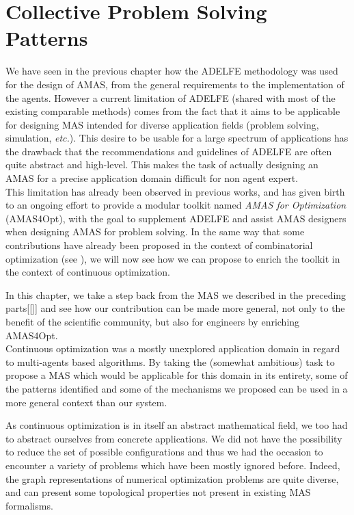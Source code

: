 \chapter{Collective Problem Solving Patterns}\label{CPSP}

We have seen in the previous chapter how the ADELFE methodology was used for the design of AMAS, from the general requirements to the implementation of the agents. However a current limitation of ADELFE (shared with most of the existing comparable methods) comes from the fact that it aims to be applicable for designing MAS intended for diverse application fields (problem solving, simulation, \emph{etc.}). This desire to be usable for a large spectrum of applications has the drawback that the recommendations and guidelines of ADELFE are often quite abstract and high-level. This makes the task of actually designing an AMAS for a precise application domain difficult for non agent expert.\\
This limitation has already been observed in previous works, and has given birth to an ongoing effort to provide a modular toolkit named \emph{AMAS for Optimization} (AMAS4Opt), with the goal to supplement ADELFE and assist AMAS designers when designing AMAS for problem solving. In the same way that some contributions have already been proposed in the context of combinatorial optimization (see \cite{Ka2011.6}), we will now see how we can propose to enrich the toolkit in the context of continuous optimization.

In this chapter, we take a step back from the MAS we described in the preceding parts[[]] and see how our contribution can be made more general, not only to the benefit of the scientific community, but also for engineers by enriching AMAS4Opt.\\
Continuous optimization was a mostly unexplored application domain in regard to multi-agents based algorithms. By taking the (somewhat ambitious) task to propose a MAS which would be applicable for this domain in its entirety, some of the patterns identified and some of the mechanisms we proposed can be used in a more general context than our system.

As continuous optimization is in itself an abstract mathematical field, we too had to abstract ourselves from concrete applications. We did not have the possibility to reduce the set of possible configurations and thus we had the occasion to encounter a variety of problems which have been mostly ignored before. Indeed, the graph representations of numerical optimization problems are quite diverse, and can present some topological properties not present in existing MAS formalisms.

